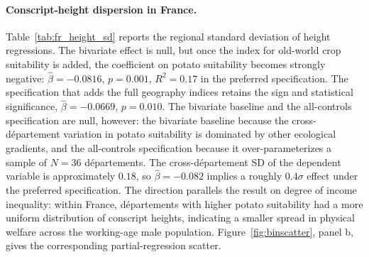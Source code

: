 \documentclass[11pt]{article}
\begin{document}
\FloatBarrier

\paragraph{Conscript-height dispersion in France.} Table~\ref{tab:fr_height_sd} reports the regional standard deviation of height regressions. The bivariate effect is null, but once the index for old-world crop suitability is added, the coefficient on potato suitability becomes strongly negative: $\hat\beta = -0.0816$, $p = 0.001$, $R^2 = 0.17$ in the preferred specification. The specification that adds the full geography indices retains the sign and statistical significance, $\hat\beta = -0.0669$, $p = 0.010$. The bivariate baseline and the all-controls specification are null, however: the bivariate baseline because the cross-département variation in potato suitability is dominated by other ecological gradients, and the all-controls specification because it over-parameterizes a sample of $N = 36$ départements. The cross-département SD of the dependent variable is approximately $0.18$, so $\hat\beta = -0.082$ implies a roughly $0.4\sigma$ effect under the preferred specification. The direction parallels the result on degree of income inequality: within France, départements with higher potato suitability had a more uniform distribution of conscript heights, indicating a smaller spread in physical welfare across the working-age male population. Figure~\ref{fig:binscatter}, panel b, gives the corresponding partial-regression scatter.
\end{document}
